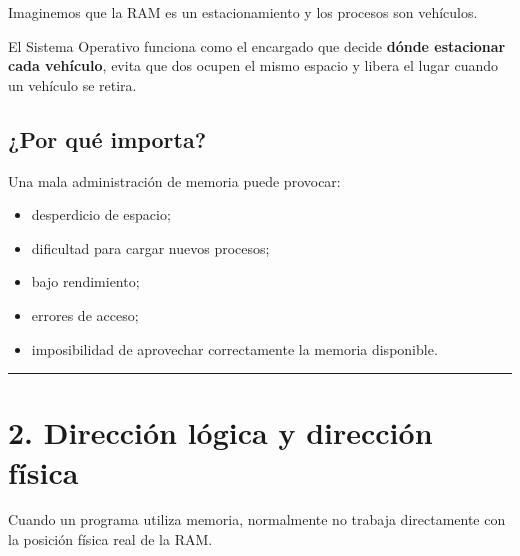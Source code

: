 \documentclass[
  spanish,
  letterpaper,
]{scrbook}
\providecommand{\tightlist}{%
  \setlength{\itemsep}{0pt}\setlength{\parskip}{0pt}}
\begin{document}
\begin{tcolorbox}[enhanced jigsaw, arc=.35mm, bottomrule=.15mm, bottomtitle=1mm, breakable, colback=white, colbacktitle=quarto-callout-note-color!10!white, colframe=quarto-callout-note-color-frame, coltitle=black, left=2mm, leftrule=.75mm, opacityback=0, opacitybacktitle=0.6, rightrule=.15mm, title=\textcolor{quarto-callout-note-color}{\faInfo}\hspace{0.5em}{Una analogía: el estacionamiento}, titlerule=0mm, toprule=.15mm, toptitle=1mm]

Imaginemos que la RAM es un estacionamiento y los procesos son
vehículos.

El Sistema Operativo funciona como el encargado que decide \textbf{dónde
estacionar cada vehículo}, evita que dos ocupen el mismo espacio y
libera el lugar cuando un vehículo se retira.

\end{tcolorbox}

\section{¿Por qué importa?}\label{por-quuxe9-importa}

Una mala administración de memoria puede provocar:

\begin{itemize}
\tightlist
\item
  desperdicio de espacio;
\item
  dificultad para cargar nuevos procesos;
\item
  bajo rendimiento;
\item
  errores de acceso;
\item
  imposibilidad de aprovechar correctamente la memoria disponible.
\end{itemize}

\begin{center}\rule{0.5\linewidth}{0.5pt}\end{center}


\chapter{2. Dirección lógica y dirección
física}\label{direcciuxf3n-luxf3gica-y-direcciuxf3n-fuxedsica}

Cuando un programa utiliza memoria, normalmente no trabaja directamente
con la posición física real de la RAM.
\end{document}
